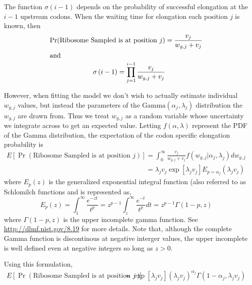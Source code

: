 \documentclass{article}
\newcommand{\elongWaitTime}{\ensuremath{w}\xspace}
\newcommand{\wgj}{\ensuremath{\elongWaitTime_{g,j}}\xspace}
\newcommand{\alphaj}{\ensuremath{{\alpha_j}}\xspace}
\newcommand{\lambdaj}{\ensuremath{{\lambda_j}}\xspace}
\newcommand{\nseWaitTime}{\ensuremath{v}\xspace}
\newcommand{\vj}{\ensuremath{\nseWaitTime_{j}}\xspace}
\begin{document}
The function $\sigma(i-1)$ depends on the probability of successful elongation at the $i-1$ upstream codons.
When the waiting time for elongation each position $j$ is known, then
 \begin{align}
  \label{eq:defElongPr}
\Pr(\text{Ribosome Sampled is at position $j$}) &=\frac{\vj}{\wgj + \vj} \\
\intertext{and}
   \label{eq:defSigmag}
   \sigma\left(i-1\right) = \prod_{j=1}^{i-1} \frac{\vj}{\wgj + \vj}
\end{align}

However, when fitting the model we don't wish to actually estimate individual \wgj values, but instead the parameters of the $\text{Gamma}\left(\alphaj, \lambdaj\right)$ distribution the \wgj are drawn from.
Thus we treat \wgj as a random variable whose uncertainty we integrate across to get an expected value.
Letting $f(\alpha, \lambda)$ represent the PDF of the Gamma distribution, the expectation of the codon specific elongation probability is
\begin{align}
\label{eq:defEElongPr}
E\left[\Pr(\text{Ribosome Sampled is at position $j$})\right] &= \int_0^\infty \frac{\vj}{\wgj + \vj} f\left(\wgj | \alphaj, \lambdaj\right) d\wgj\\
\label{eq:defEElongPrII}
 &= \lambdaj \vj \exp\left[\lambdaj \vj\right] E_{p = \alphaj}\left(\lambdaj \vj\right)
\end{align}
where $E_p(z)$ is the generalized exponential integral function (also referred to as Schlomilch functions \citep[][p.380]{OldhamEtAl2009} and is represented as,
\begin{equation}
  \label{eq:defGeneralizedExpoInt}
   E_p(z) = \int_1^\infty \frac{e^{-z t}}{t^p} = z^{p-1} \int_z^\infty \frac{e^{-t}}{t^p} dt = z^{p-1} \Gamma(1-p,z)
\end{equation}
where $\Gamma(1-p,z)$ is the upper incomplete gamma function.
See \href{http://dlmf.nist.gov/8.19}{http://dlmf.nist.gov/8.19} for more details.
Note that, although the complete Gamma function is discontinous at negative interger values, the upper incomplete is well defined even at negative integers so long as $z>0$.

Using this formulation, 
\begin{align}
\label{eq:defEElongPrIII}
E\left[\Pr(\text{Ribosome Sampled is at position $j$})\right] &= \exp\left[\lambdaj \vj\right] \left(\lambdaj \vj\right)^\alphaj  \Gamma(1-\alphaj, \lambdaj \vj)
\end{align}
\end{document}
